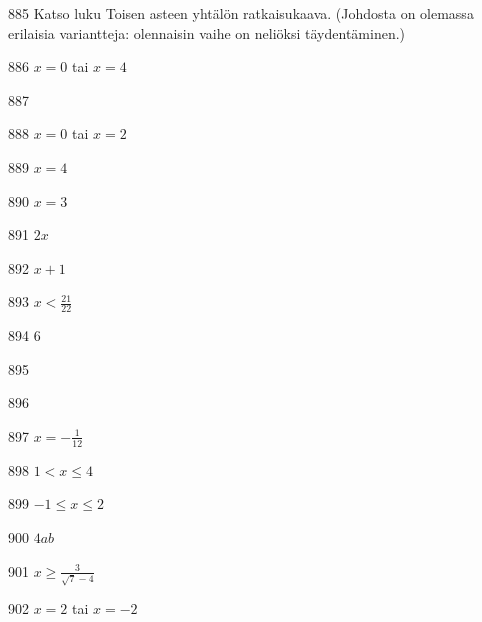 \begin{Vastaus}{885}
	Katso luku Toisen asteen yhtälön ratkaisukaava. (Johdosta on olemassa erilaisia variantteja: olennaisin vaihe on neliöksi täydentäminen.)
	
\end{Vastaus}
\begin{Vastaus}{886}
$x=0$ tai $x=4$
\end{Vastaus}
\begin{Vastaus}{887}
\end{Vastaus}
\begin{Vastaus}{888}
$x=0$ tai $x=2$
\end{Vastaus}
\begin{Vastaus}{889}
$x = 4$
\end{Vastaus}
\begin{Vastaus}{890}
$x=3$
\end{Vastaus}
\begin{Vastaus}{891}
$2x$
\end{Vastaus}
\begin{Vastaus}{892}
$x+1$
\end{Vastaus}
\begin{Vastaus}{893}
$x<\frac{21}{22}$
\end{Vastaus}
\begin{Vastaus}{894}
$6$
\end{Vastaus}
\begin{Vastaus}{895}
\end{Vastaus}
\begin{Vastaus}{896}
	
\end{Vastaus}
\begin{Vastaus}{897}
$x=-\frac{1}{12}$
\end{Vastaus}
\begin{Vastaus}{898}
$1<x \leq 4$
\end{Vastaus}
\begin{Vastaus}{899}
$-1 \leq x \leq 2$
\end{Vastaus}
\begin{Vastaus}{900}
$4ab$
\end{Vastaus}
\begin{Vastaus}{901}
$x \geq \frac{3}{\sqrt{7}-4}$
\end{Vastaus}
\begin{Vastaus}{902}
$x=2$ tai $x=-2$
\end{Vastaus}
